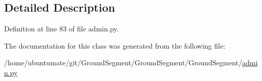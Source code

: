 \subsection{Detailed Description}


Definition at line 83 of file admin.\+py.



The documentation for this class was generated from the following file\+:\begin{DoxyCompactItemize}
\item 
/home/ubuntumate/git/\+Ground\+Segment/\+Ground\+Segment/\+Ground\+Segment/\hyperlink{admin_8py}{admin.\+py}\end{DoxyCompactItemize}
